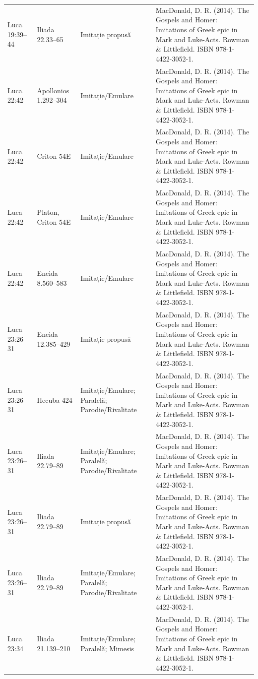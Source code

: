 \documentclass[12pt,a4paper,twoside,openany]{book}
\begin{document}
\begin{longtable}{L{1.4cm}L{1.7cm}L{3.1cm}L{8.4cm}}
Luca 19:39–44 & Iliada 22.33–65 & Imitație propusă & MacDonald, D. R. (2014). The Gospels and Homer: Imitations of Greek epic in Mark and Luke-Acts. Rowman \& Littlefield. ISBN 978-1-4422-3052-1. \\
Luca 22:42 & Apollonios 1.292–304 & Imitație/Emulare & MacDonald, D. R. (2014). The Gospels and Homer: Imitations of Greek epic in Mark and Luke-Acts. Rowman \& Littlefield. ISBN 978-1-4422-3052-1. \\
Luca 22:42 & Criton 54E & Imitație/Emulare & MacDonald, D. R. (2014). The Gospels and Homer: Imitations of Greek epic in Mark and Luke-Acts. Rowman \& Littlefield. ISBN 978-1-4422-3052-1. \\
Luca 22:42 & Platon, Criton 54E & Imitație/Emulare & MacDonald, D. R. (2014). The Gospels and Homer: Imitations of Greek epic in Mark and Luke-Acts. Rowman \& Littlefield. ISBN 978-1-4422-3052-1. \\
Luca 22:42 & Eneida 8.560–583 & Imitație/Emulare & MacDonald, D. R. (2014). The Gospels and Homer: Imitations of Greek epic in Mark and Luke-Acts. Rowman \& Littlefield. ISBN 978-1-4422-3052-1. \\
Luca 23:26–31 & Eneida 12.385–429 & Imitație propusă & MacDonald, D. R. (2014). The Gospels and Homer: Imitations of Greek epic in Mark and Luke-Acts. Rowman \& Littlefield. ISBN 978-1-4422-3052-1. \\
Luca 23:26–31 & Hecuba 424 & Imitație/Emulare; Paralelă; Parodie/Rivalitate & MacDonald, D. R. (2014). The Gospels and Homer: Imitations of Greek epic in Mark and Luke-Acts. Rowman \& Littlefield. ISBN 978-1-4422-3052-1. \\
Luca 23:26–31 & Iliada 22.79–89 & Imitație/Emulare; Paralelă; Parodie/Rivalitate & MacDonald, D. R. (2014). The Gospels and Homer: Imitations of Greek epic in Mark and Luke-Acts. Rowman \& Littlefield. ISBN 978-1-4422-3052-1. \\
Luca 23:26–31 & Iliada 22.79–89 & Imitație propusă & MacDonald, D. R. (2014). The Gospels and Homer: Imitations of Greek epic in Mark and Luke-Acts. Rowman \& Littlefield. ISBN 978-1-4422-3052-1. \\
Luca 23:26–31 & Iliada 22.79–89 & Imitație/Emulare; Paralelă; Parodie/Rivalitate & MacDonald, D. R. (2014). The Gospels and Homer: Imitations of Greek epic in Mark and Luke-Acts. Rowman \& Littlefield. ISBN 978-1-4422-3052-1. \\
Luca 23:34 & Iliada 21.139–210 & Imitație/Emulare; Paralelă; Mimesis & MacDonald, D. R. (2014). The Gospels and Homer: Imitations of Greek epic in Mark and Luke-Acts. Rowman \& Littlefield. ISBN 978-1-4422-3052-1. \\

\end{longtable}
\end{document}
